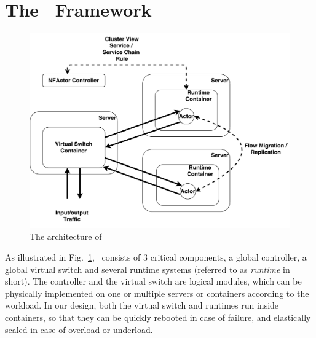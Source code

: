 \section{The \nfactor~Framework}
\label{sec:overview}


\begin{figure}[!h]
        \centering
        \includegraphics[width=\columnwidth]{figure/NFActor-Overview.pdf}
        \caption{The architecture of \nfactor}
        \label{fig:nfactor-cluster}
\end{figure} 


As illustrated in Fig.~\ref{fig:nfactor-cluster}, %
\nfactor~consists of 3 critical components, a global controller, a global virtual switch and several runtime systems (referred to as {\em runtime} in short). The controller and the virtual switch are logical modules, which can be physically implemented on one or multiple servers or containers according to the workload. In our design, both the virtual switch and runtimes run inside containers, so that they can be quickly rebooted in case of failure, and elastically scaled in case of overload or underload. 

